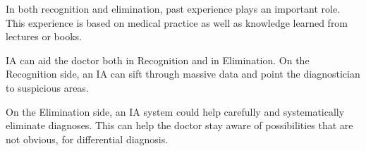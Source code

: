 \documentclass[11pt]{pnas-new}
\begin{document}
In both recognition and elimination, past experience plays an important role. This experience is based on medical practice as well as knowledge learned from lectures or books. 

IA can aid the doctor both in Recognition and in Elimination. On the Recognition side, an IA can sift through massive data and point the diagnostician to suspicious areas.

On the Elimination side, an IA system could help carefully and systematically
eliminate diagnoses. This can help the doctor stay aware of possibilities that are not obvious, for differential diagnosis.


\iffalse
To make a decision based
on elimination, slow thinking with focused attention is critical
\cite{michel2020thinking}. 

An intelligent system could be extremely helpful for this
purpose. An intelligent system could help carefully and slowly
eliminate possible choices, and if it end up in a gray zone with
multiple possibilities, it says IDK. This would dramatically help
physicians daily practice.


{\bf Sources of uncertainty in medical diagnosis.}
\begin{itemize}
  \item{\bf The diagnostic process of elimination}
  \item{\bf Data Quality, Calibration, resolution} Discuss issue as placement of sensors, .
  \end{itemize}

 {\bf Hiding Uncertainty}
  \begin{itemize}
    \item {\bf Psychological reasons} Both doctor and patient prefer
      the projection of certitude.
    \item {\bf Protocols} --done
    \item {\bf diagnostic devices} Secrecy of the internal code limits
      the trustworthiness of the alarms.--done
    \item{\bf Alarm Fatigue}--done
  \end{itemize}
\fi
\end{document}
